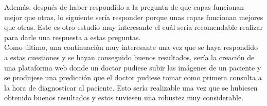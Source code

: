 Además, después de haber respondido a la pregunta de que capas funcionan mejor que otras, lo siguiente sería responder porque unas capas funcionan mejores que otras. Este es otro estudio muy interesante el cuál sería recomendable realizar para darle una respuesta a estas preguntas.\\

Como último, una continuación muy interesante una vez que se haya respondido a estas cuestiones y se hayan conseguido buenos resultados, sería la creación de una plataforma web donde un doctor pudiese subir las imágenes de un paciente y se produjese una predicción que el doctor pudiese tomar como primera consulta a la hora de diagnosticar al paciente. Esto sería realizable una vez que se hubiesen obtenido buenos resultados y estos tuviesen una robustez muy considerable.\\
